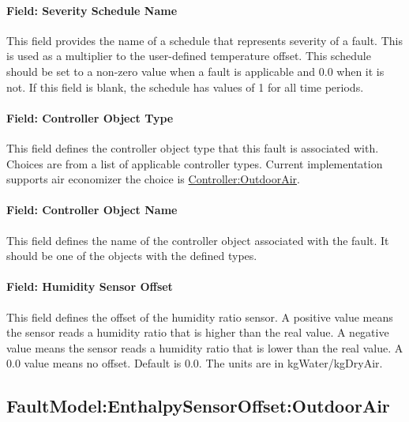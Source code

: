 \paragraph{Field: Severity Schedule Name}\label{field-severity-schedule-name-1}

This field provides the name of a schedule that represents severity of a fault. This is used as a multiplier to the user-defined temperature offset. This schedule should be set to a non-zero value when a fault is applicable and 0.0 when it is not. If this field is blank, the schedule has values of 1 for all time periods.

\paragraph{Field: Controller Object Type}\label{field-controller-object-type-1}

This field defines the controller object type that this fault is associated with. Choices are from a list of applicable controller types. Current implementation supports air economizer the choice is \hyperref[controlleroutdoorair]{Controller:OutdoorAir}.

\paragraph{Field: Controller Object Name}\label{field-controller-object-name-1}

This field defines the name of the controller object associated with the fault. It should be one of the objects with the defined types.

\paragraph{Field: Humidity Sensor Offset}\label{field-humidity-sensor-offset}

This field defines the offset of the humidity ratio sensor. A positive value means the sensor reads a humidity ratio that is higher than the real value. A negative value means the sensor reads a humidity ratio that is lower than the real value. A 0.0 value means no offset. Default is 0.0. The units are in kgWater/kgDryAir.

\subsection{FaultModel:EnthalpySensorOffset:OutdoorAir}\label{faultmodelenthalpysensoroffsetoutdoorair}

